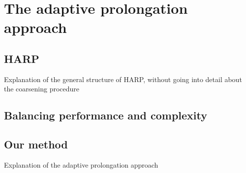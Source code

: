 \section{The adaptive prolongation approach}
\subsection{HARP}
Explanation of the general structure of HARP, without going into detail about the coarsening procedure

\subsection{Balancing performance and complexity}

\subsection{Our method}
Explanation of the adaptive prolongation approach
